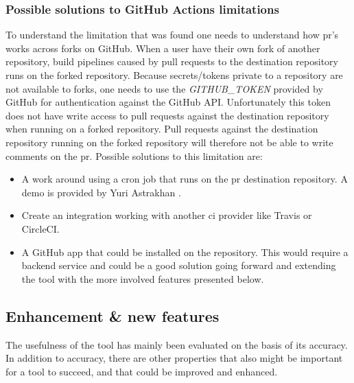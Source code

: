 \documentclass[pdftex,10pt,b5paper,twoside]{report}
\begin{document}
\subsubsection{Possible solutions to GitHub Actions limitations}

\label{possible-solutions}
To understand the limitation that was found one needs to understand how \gls{pr}'s works across forks on GitHub. When a user have their own fork of another repository, build pipelines caused by pull requests to the destination repository runs on the forked repository. Because secrets/tokens private to a repository are not available to forks, one needs to use the \textit{GITHUB\_TOKEN} provided by GitHub for authentication against the GitHub API. Unfortunately this token does not have write access to pull requests against the destination repository when running on a forked repository. Pull requests against the destination repository running on the forked repository will therefore not be able to write comments on the \gls{pr}. Possible solutions to this limitation are: 
\begin{itemize}
    \item A work around using a cron job that runs on the \gls{pr} destination repository. A demo is provided by Yuri Astrakhan \cite{workaround-demo}. 
    
    \item Create an integration working with another \gls{ci} provider like Travis or CircleCI. 
    
    \item A GitHub app that could be installed on the repository. This would require a backend service and could be a good solution going forward and extending the tool with the more involved features presented below.
\end{itemize}

\label{futurework}


\subsection*{Enhancement \& new features}

The usefulness of the tool has mainly been evaluated on the basis of its accuracy. In addition to accuracy, there are other properties that also might be important for a tool to succeed, and that could be improved and enhanced. 
\end{document}
